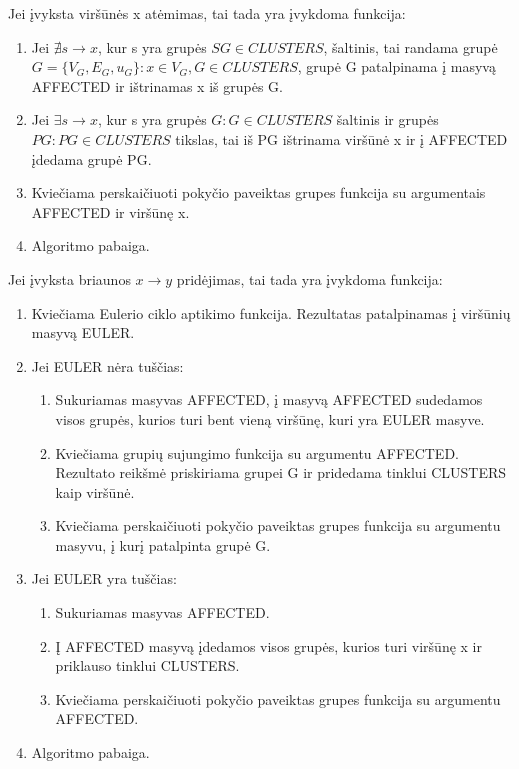 Jei įvyksta viršūnės x atėmimas, tai tada yra įvykdoma funkcija:
\begin{enumerate}
\item Jei $\nexists s \rightarrow x$, kur s yra grupės $SG \in CLUSTERS$, šaltinis, tai randama grupė $G=\{V_G, E_G, u_G\} : x \in V_G, G \in CLUSTERS$, grupė G patalpinama į masyvą AFFECTED ir ištrinamas x iš grupės G.
\item Jei $\exists s \rightarrow x$, kur s yra grupės $G : G \in CLUSTERS$ šaltinis ir grupės $PG : PG \in CLUSTERS$ tikslas, tai iš PG ištrinama viršūnė x ir į AFFECTED įdedama grupė PG.
\item Kviečiama perskaičiuoti pokyčio paveiktas grupes funkcija su argumentais AFFECTED ir viršūnę x.
\item Algoritmo pabaiga. 
\end{enumerate}

Jei įvyksta briaunos $x \rightarrow y$ pridėjimas, tai tada yra įvykdoma funkcija:
\begin{enumerate}
	\item Kviečiama Eulerio ciklo aptikimo funkcija. Rezultatas patalpinamas į viršūnių masyvą EULER.
	\item Jei EULER nėra tuščias:
		\begin{enumerate}
			\item Sukuriamas masyvas AFFECTED, į masyvą AFFECTED sudedamos visos grupės, kurios turi bent vieną viršūnę, kuri yra EULER masyve.
			\item Kviečiama grupių sujungimo funkcija su argumentu AFFECTED. Rezultato reikšmė priskiriama grupei G ir pridedama tinklui CLUSTERS kaip viršūnė.
			\item Kviečiama perskaičiuoti pokyčio paveiktas grupes funkcija su argumentu masyvu, į kurį patalpinta grupė G.
		\end{enumerate} 
	\item Jei EULER yra tuščias:
		\begin{enumerate}
			\item Sukuriamas masyvas AFFECTED.
			\item Į AFFECTED masyvą įdedamos visos grupės, kurios turi viršūnę x ir priklauso tinklui CLUSTERS.
			\item Kviečiama perskaičiuoti pokyčio paveiktas grupes funkcija su argumentu AFFECTED.
		\end{enumerate} 
	\item Algoritmo pabaiga. 
\end{enumerate}

